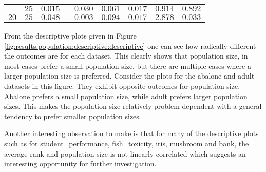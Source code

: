 \begin{table}[htbp]
{\begin{tabular}{lrrrrrrr}
			$ $                  & $25$                 & $0.015$              & $-0.030$                                        & $0.061$              & $0.017$              & $0.914$              & $0.892$     \\
			$20$                 & $25$                 & $0.048$              & $0.003$                                         & $0.094$              & $0.017$              & $2.878$              & $0.033$     \\
			\bottomrule
		\end{tabular}
	}
\end{table}

From the descriptive plots given in Figure \ref{fig:results:population:descriptive:descriptive} one can see how radically different the outcomes are for each dataset. This clearly shows that population size, in most cases prefer a small population size, but there are multiple cases where a larger population size is preferred. Consider the plots for the abalone and adult datasets in this figure. They exhibit opposite outcomes for population size. Abalone prefers a small population size, while adult prefers larger population sizes. This makes the population size relatively problem dependent with a general tendency to prefer smaller population sizes.

Another interesting observation to make is that for many of the descriptive plots such as for student\_performance, fish\_toxicity, iris, mushroom and bank, the average rank and population size is not linearly correlated which suggests an interesting opportunity for further investigation.


